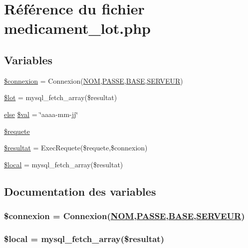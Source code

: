 \hypertarget{medicament__lot_8php}{
\section{R\'{e}f\'{e}rence du fichier medicament\_\-lot.php}
\label{medicament__lot_8php}
}
\subsection*{Variables}
\begin{CompactItemize}
\item 
\hyperlink{medicament__lot_8php_a0}{\$connexion} = Connexion(\hyperlink{pma__connect_8php_a0}{NOM},\hyperlink{pma__connect_8php_a1}{PASSE},\hyperlink{pma__connect_8php_a3}{BASE},\hyperlink{pma__connect_8php_a2}{SERVEUR})
\item 
\hyperlink{medicament__lot_8php_a1}{\$lot} = mysql\_\-fetch\_\-array(\$resultat)
\item 
\hyperlink{cron_8php_a9}{else} \hyperlink{medicament__lot_8php_a2}{\$val} = \char`\"{}aaaa-mm-jj\char`\"{}
\item 
\hyperlink{medicament__lot_8php_a3}{\$requete}
\item 
\hyperlink{medicament__lot_8php_a4}{\$resultat} = Exec\-Requete(\$requete,\$connexion)
\item 
\hyperlink{medicament__lot_8php_a5}{\$local} = mysql\_\-fetch\_\-array(\$resultat)
\end{CompactItemize}


\subsection{Documentation des variables}
\hypertarget{medicament__lot_8php_a0}{
\subsubsection[\$connexion]{\setlength{\rightskip}{0pt plus 5cm}\$connexion = Connexion(\hyperlink{pma__connect_8php_a0}{NOM},\hyperlink{pma__connect_8php_a1}{PASSE},\hyperlink{pma__connect_8php_a3}{BASE},\hyperlink{pma__connect_8php_a2}{SERVEUR})}}
\label{medicament__lot_8php_a0}


\hypertarget{medicament__lot_8php_a5}{
\subsubsection[\$local]{\setlength{\rightskip}{0pt plus 5cm}\$local = mysql\_\-fetch\_\-array(\$resultat)}}
\label{medicament__lot_8php_a5}


